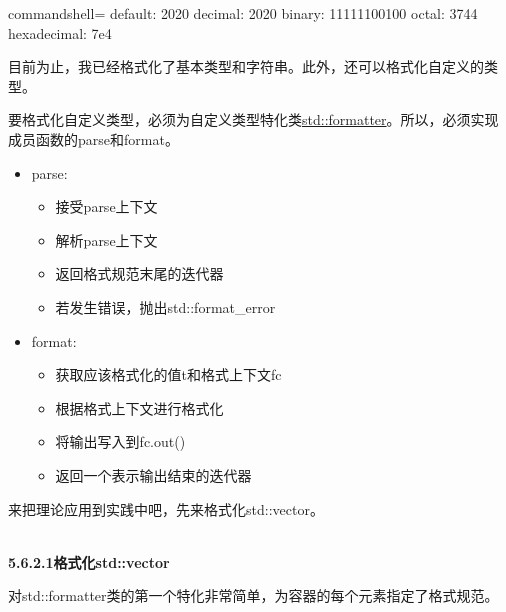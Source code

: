 \begin{tcblisting}{commandshell={}}
default:     2020
decimal:     2020
binary:      11111100100
octal:       3744
hexadecimal: 7e4
\end{tcblisting}

目前为止，我已经格式化了基本类型和字符串。此外，还可以格式化自定义的类型。


要格式化自定义类型，必须为自定义类型特化类\href{https://en.cppreference.com/w/cpp/utility/format/formatter}{std::formatter}。所以，必须实现成员函数的parse和format。

\begin{itemize}
\item 
parse:
\begin{itemize}
\item 
接受parse上下文

\item 
解析parse上下文

\item 
返回格式规范末尾的迭代器

\item 
若发生错误，抛出std::format\_error
\end{itemize}

\item 
format:
\begin{itemize}
\item 
获取应该格式化的值t和格式上下文fc

\item 
根据格式上下文进行格式化

\item 
将输出写入到fc.out()

\item 
返回一个表示输出结束的迭代器
\end{itemize}
\end{itemize}

来把理论应用到实践中吧，先来格式化std::vector。

\hspace*{\fill} \\ %
\noindent
\textbf{5.6.2.1\hspace{0.2cm}格式化std::vector}

对std::formatter类的第一个特化非常简单，为容器的每个元素指定了格式规范。

